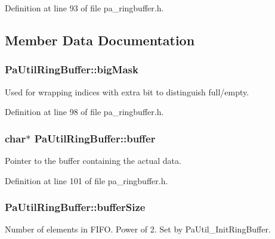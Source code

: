 Definition at line 93 of file pa\+\_\+ringbuffer.\+h.



\subsection{Member Data Documentation}
\subsubsection[{\texorpdfstring{big\+Mask}{bigMask}}]{ Pa\+Util\+Ring\+Buffer\+::big\+Mask}\hypertarget{struct_pa_util_ring_buffer_a15f2f074f86d67747ac3d7cddd722d3e}{}\label{struct_pa_util_ring_buffer_a15f2f074f86d67747ac3d7cddd722d3e}
Used for wrapping indices with extra bit to distinguish full/empty. 

Definition at line 98 of file pa\+\_\+ringbuffer.\+h.

\subsubsection[{\texorpdfstring{buffer}{buffer}}]{\setlength{\rightskip}{0pt plus 5cm}char$\ast$ Pa\+Util\+Ring\+Buffer\+::buffer}\hypertarget{struct_pa_util_ring_buffer_ac16a18dca2fc3becee50d159cf2074f2}{}\label{struct_pa_util_ring_buffer_ac16a18dca2fc3becee50d159cf2074f2}
Pointer to the buffer containing the actual data. 

Definition at line 101 of file pa\+\_\+ringbuffer.\+h.

\subsubsection[{\texorpdfstring{buffer\+Size}{bufferSize}}]{ Pa\+Util\+Ring\+Buffer\+::buffer\+Size}\hypertarget{struct_pa_util_ring_buffer_ae4e41eb1cc214406adb26203d4643371}{}\label{struct_pa_util_ring_buffer_ae4e41eb1cc214406adb26203d4643371}
Number of elements in F\+I\+FO. Power of 2. Set by Pa\+Util\+\_\+\+Init\+Ring\+Buffer. 

